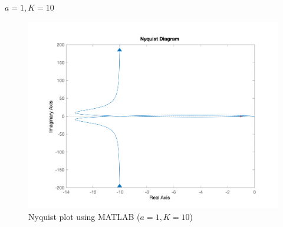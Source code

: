 \begin{itemize}
	$a = 1, K = 10$
	\begin{figure}[H]
		\caption{Nyquist plot using MATLAB ($a = 1, K = 10$)}
		\centering
		\includegraphics[width=12cm]{../Figure/Q2/MATAB-Nyquist_K_bigger.png}
	\end{figure}
\end{itemize}

